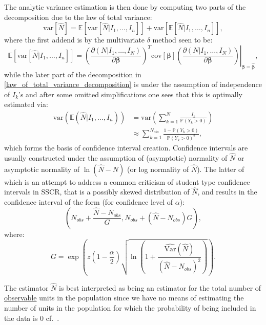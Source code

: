\documentclass[
]{jss}
\newcommand{\1}{\mathcal{I}} \newcommand{\bx}{\boldsymbol{x}}
\begin{document}
The analytic variance estimation is then done by computing two parts of
the decomposition due to the law of total variance:
\begin{equation}\label{law_of_total_variance_decomposition}
  \text{var}[\hat{N}]=
  \mathbb{E}\left[\text{var}
  \left[\hat{N}|I_{1},\dots,I_{n}\right]\right]+
  \text{var}\left[\mathbb{E}[\hat{N}|I_{1},\dots,I_{n}]\right],
\end{equation} where the first addend is by the multivariate \(\delta\)
method seen to be: \begin{equation}
  \mathbb{E}\left[\text{var}
  \left[\hat{N}|I_{1},\dots,I_{n}\right]\right]=
  \left.\left(\frac{\partial(N|I_1,\dots,I_N)}{\partial\boldsymbol{\beta}}\right)^{T}
  \text{cov}\left[\boldsymbol{\beta}\right]
  \left(\frac{\partial(N|I_1,\dots,I_N)}{\partial\boldsymbol{\beta}}\right)
  \right|_{\boldsymbol{\beta}=\hat{\boldsymbol{\beta}}},
\end{equation} while the later part of the decomposition in
\eqref{law_of_total_variance_decomposition} is under the assumption of
independence of \(I_{k}\)'s and after some omitted simplifications one
sees that this is optimally estimated via: \begin{align}
  \text{var}\left(\mathbb{E}(\hat{N}|I_{1},\dots,I_{n})\right)&=
  \text{var}\left(\sum_{k=1}^{N}\frac{I_{k}}{\mathbb{P}(Y_{k}>0)}\right)\nonumber\\
  &\approx\sum_{k=1}^{N_{obs}}\frac{1-\mathbb{P}(Y_{k}>0)}{\mathbb{P}(Y_{k}>0)^{2}},
\end{align} which forms the basis of confidence interval creation.
Confidence intervals are usually constructed under the assumption of
(asymptotic) normality of \(\hat{N}\) or asymptotic normality of
\(\ln(\hat{N}-N)\) (or log normality of \(\hat{N}\)). The latter of
which is an attempt to address a common criticism of student type
confidence intervals in SSCR, that is a possibly skewed distribution of
\(\hat{N}\), and results in the confidence interval of the form (for
confidence level of \(\alpha\)): \begin{equation*}
  \left(N_{obs}+\frac{\hat{N}-N_{obs}}{G},N_{obs}+\left(\hat{N}-N_{obs}\right)G\right),
\end{equation*} where: \begin{equation*}
  G = \exp\left(z\left(1-\frac{\alpha}{2}\right)
  \sqrt{\ln\left(1+\frac{\widehat{\text{Var}}(\hat{N})}{\left(\hat{N}-N_{obs}\right)^{2}}\right)}\right).
\end{equation*}

The estimator \(\hat{N}\) is best interpreted as being an estimator for
the total number of \underline{observable} units in the population since
we have no means of estimating the number of units in the population for
which the probability of being included in the data is \(0\)
cf.~\cite{ztpoisson}.
\end{document}
